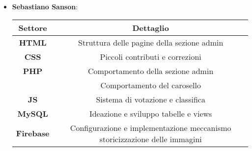 \begin{itemize}
    \clearpage

    \item \textbf{Sebastiano Sanson}: 
    \begin{center}
        \begin{tabular}{| c | c |}
            \hline
            \textbf{Settore} & \textbf{Dettaglio}  \\ [0.5ex]
            \hline \hline
            \textbf{HTML} & Struttura delle pagine della sezione admin \\
            \hline
            \textbf{CSS} & Piccoli contributi e correzioni \\
            \hline
            \textbf{PHP} & Comportamento della sezione admin \\
            & Comportamento del carosello \\
            \hline
            \textbf{JS} & Sistema di votazione e classifica \\
            \hline
            \textbf{MySQL} & Ideazione e sviluppo tabelle e views \\
            \hline
            \textbf{Firebase} & Configurazione e implementazione meccanismo storicizzazione delle immagini \\
            \hline
        \end{tabular}
    \end{center}
\end{itemize}